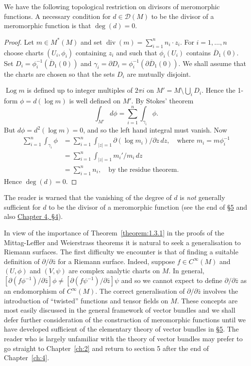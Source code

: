We have the following topological restriction on divisors of meromorphic functions.
 A necessary condition for $d\in\mathcal D(M)$ to be the divisor of a meromorphic function is that $\deg(d)=0$.
\begin{proof}
Let $m\in M^*(M)$ and set $\operatorname{div}(m)=\sum_{i=1}^n n_i\cdot z_i$. For $i=1,\ldots,n$ choose charts $(U_i,\phi_i)$ containing $z_i$ and such that $\phi_i(U_i)$ contains $\overline D_1(0)$. Set $D_i=\phi_i^{-1}(\overline D_1(0))$ and $\gamma_i=\partial D_i=\phi_i^{-1}(\partial\overline D_1(0))$. We shall assume that the charts are chosen so that the sets $D_i$ are mutually disjoint.

$\operatorname{Log}m$ is defined up to integer multiples of $2\pi i$ on $M'=M\setminus\bigcup_iD_i$. Hence the 1-form $\phi=d(\log m)$ is well defined on $M'$. By Stokes' theorem
\[ \int_{M'}d\phi=\sum_{i=1}^n\int_{\gamma_i}\phi. \]
But $d\phi=d^2(\log m)=0$, and so the left hand integral must vanish. Now
\begin{align*}
\sum_{i=1}^n\int_{\gamma_i}\phi
&=\sum_{i=1}^n\int_{|z|=1}\partial(\log m_i)/\partial z\,dz,\quad\text{where }m_i=m\phi_i^{-1}\\
&=\sum_{i=1}^n\int_{|z|=1}m_i'/m_i\,dz\\
&=\sum_{i=1}^n n_i,\quad\text{by the residue theorem.}
\end{align*}
Hence $\deg(d)=0$.
\end{proof}
The reader is warned that the vanishing of the degree of $d$ is \emph{not} generally sufficient for $d$ to be the divisor of a meromorphic function (see the end of \hyperref[sec:1:5]{\S5} and also \hyperref[sec:4:4]{Chapter 4, \S4}).

In view of the importance of Theorem~\ref{theorem:1.3.1} in the proofs of the Mittag-Leffler and Weierstrass theorems it is natural to seek a generalisation to Riemann surfaces. The first difficulty we encounter is that of finding a suitable definition of $\partial/\partial\bar z$ for a Riemann surface. Indeed, suppose $f\in C^\infty(M)$ and $(U,\phi)$ and $(V,\psi)$ are complex analytic charts on $M$.
In general, $[\partial(f\phi^{-1})/\partial\bar z]\phi\ne[\partial(f\psi^{-1})/\partial\bar z]\psi$ and so we cannot expect to define $\partial/\partial\bar z$ as an endomorphism of $C^\infty(M)$. The correct generalisation of $\partial/\partial\bar z$ involves the introduction of ``twisted'' functions and tensor fields on $M$. These concepts are most easily discussed in the general framework of vector bundles and we shall defer further consideration of the construction of meromorphic functions until we have developed sufficient of the elementary theory of vector bundles in \hyperref[sec:1:5]{\S5}. The reader who is largely unfamiliar with the theory of vector bundles may prefer to go straight to Chapter~\ref{ch:2} and return to section 5 after the end of Chapter~\ref{ch:4}.

